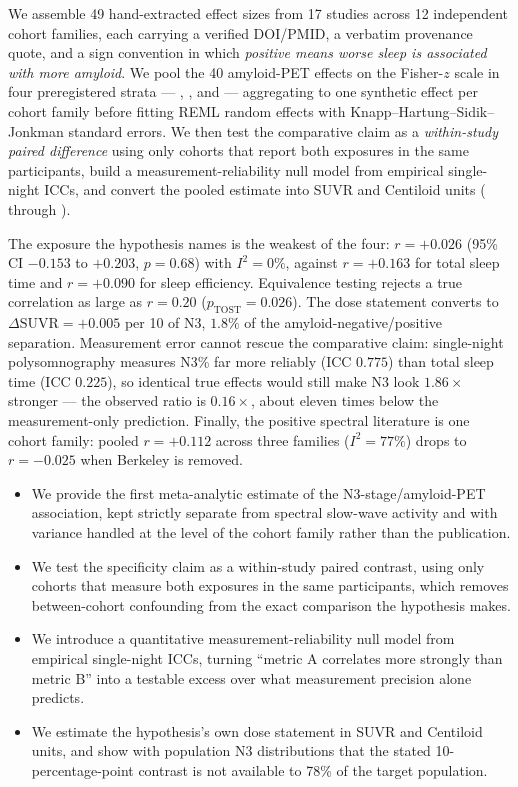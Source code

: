  We assemble 49 hand-extracted effect sizes from 17 studies across 12
independent cohort families, each carrying a verified DOI/PMID, a verbatim provenance quote, and
a sign convention in which \emph{positive means worse sleep is associated with more amyloid}.
We pool the 40 amyloid-PET effects on the Fisher-$z$ scale in four preregistered strata ---
\stage, \spectral, \tst and \se{} --- aggregating to one synthetic effect per cohort family
before fitting REML random effects with Knapp--Hartung--Sidik--Jonkman standard errors. We then
test the comparative claim as a \emph{within-study paired difference} using only cohorts that
report both exposures in the same participants, build a measurement-reliability null model from
empirical single-night ICCs, and convert the pooled estimate into SUVR and Centiloid units
( through ).

 The exposure the hypothesis names is the weakest of the four:
$r = +0.026$ (95\% CI $-0.153$ to $+0.203$, $p = 0.68$) with $I^2 = 0\%$, against $r = +0.163$
for total sleep time and $r = +0.090$ for sleep efficiency. Equivalence testing rejects a true
correlation as large as $r = 0.20$ ($p_{\mathrm{TOST}} = 0.026$). The dose statement converts to
$\Delta\mathrm{SUVR} = +0.005$ per 10 \pp of N3, $1.8\%$ of the amyloid-negative/positive
separation. Measurement error cannot rescue the comparative claim: single-night polysomnography
measures N3\% far more reliably (ICC $0.775$) than total sleep time (ICC $0.225$), so identical
true effects would still make N3 look $1.86\times$ stronger --- the observed ratio is
$0.16\times$, about eleven times below the measurement-only prediction. Finally, the positive
spectral literature is one cohort family: pooled $r = +0.112$ across three families
($I^2 = 77\%$) drops to $r = -0.025$ when Berkeley is removed.

\begin{itemize}[leftmargin=*,itemsep=1pt,topsep=2pt]
    \item We provide the first meta-analytic estimate of the N3-stage/amyloid-PET association,
    kept strictly separate from spectral slow-wave activity and with variance handled at the
    level of the cohort family rather than the publication.
    \item We test the specificity claim as a within-study paired contrast, using only cohorts
    that measure both exposures in the same participants, which removes between-cohort
    confounding from the exact comparison the hypothesis makes.
    \item We introduce a quantitative measurement-reliability null model from empirical
    single-night ICCs, turning ``metric A correlates more strongly than metric B'' into a
    testable excess over what measurement precision alone predicts.
    \item We estimate the hypothesis's own dose statement in SUVR and Centiloid units, and show
    with population N3 distributions that the stated 10-percentage-point contrast is not
    available to 78\% of the target population.
\end{itemize}

